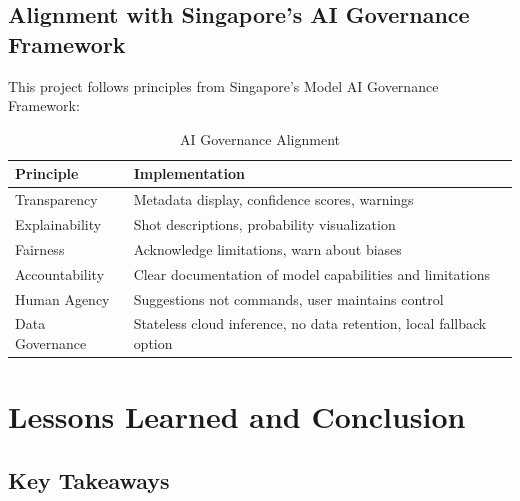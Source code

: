 \documentclass[11pt,a4paper]{article}
\begin{document}
\subsection{Alignment with Singapore's AI Governance Framework}

This project follows principles from Singapore's Model AI Governance Framework:

\begin{table}[H]
\centering
\caption{AI Governance Alignment}
\begin{tabular}{p{3cm}p{9cm}}
\toprule
\textbf{Principle} & \textbf{Implementation} \\
\midrule
Transparency & Metadata display, confidence scores, warnings \\
Explainability & Shot descriptions, probability visualization \\
Fairness & Acknowledge limitations, warn about biases \\
Accountability & Clear documentation of model capabilities and limitations \\
Human Agency & Suggestions not commands, user maintains control \\
Data Governance & Stateless cloud inference, no data retention, local fallback option \\
\bottomrule
\end{tabular}
\end{table}

\section{Lessons Learned and Conclusion}

\subsection{Key Takeaways}
\end{document}
